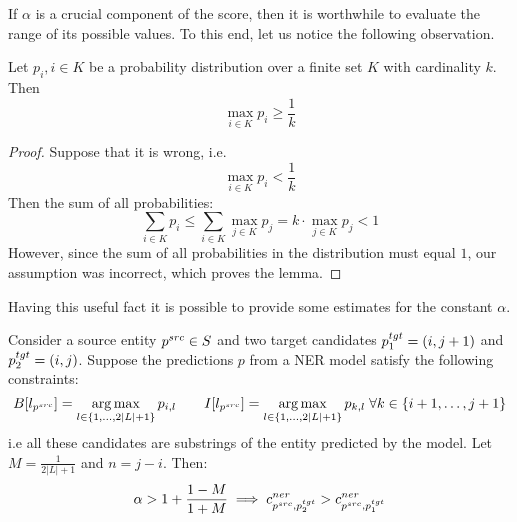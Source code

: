 If \( \alpha \) is a crucial component of the score, then it is worthwhile to
evaluate the range of its possible values. To this end, let us notice the
following observation.
\begin{lemma} \label{lemma:maxprob_greater_than_avg}
  Let \( p_{i}, i \in K \) be a probability distribution over a finite set \( K \) with cardinality \( k \).
  Then
  \[
    \max\limits_{i \in K} p_i \geq \frac{1}{k}
  \]
\end{lemma}
\begin{proof}
  Suppose that it is wrong, i.e.
  \[
    \max\limits_{i \in K} p_i < \frac{1}{k}
  \]
  Then the sum of all probabilities:
  \[
    \sum\limits_{i \in K} p_i \leq \sum\limits_{i \in K} \max\limits_{j \in K} p_j =
    k \cdot \max\limits_{j \in K} p_j < 1
  \]
  However, since the sum of all probabilities in the distribution must equal \( 1 \),
  our assumption was incorrect, which proves the lemma.
\end{proof}
Having this useful fact it is possible to provide some estimates for the constant \( \alpha \).
\begin{theorem}
  Consider a source entity \( p^{src} \in S \) and two target candidates \( p_1^{tgt} = (i, j+1) \)
  and \( p_2^{tgt} = (i, j) \). Suppose the predictions \( p \) from a NER model satisfy
  the following constraints:
  \[
    B[l_{p^{src}}] = \operatorname*{arg\,max}\limits_{l \in \{ 1, \dots, 2|L| + 1 \}} p_{i, l} \qquad
    I[l_{p^{src}}] = \operatorname*{arg\,max}\limits_{l \in \{ 1, \dots, 2|L| + 1 \}} p_{k, l} \; \forall k \in \{ i + 1, \dots ,j +1 \}
  \]
  i.e all these candidates are substrings of the entity predicted by the model.
  Let \( M = \frac{1}{2|L| + 1} \) and \( n = j - i \). Then:
  \[
    \alpha > 1 + \frac{1 - M}{1 + M} \implies c_{p^{src}, p_2^{tgt}}^{ner} > c_{p^{src}, p_1^{tgt}}^{ner}
  \]
\end{theorem}
